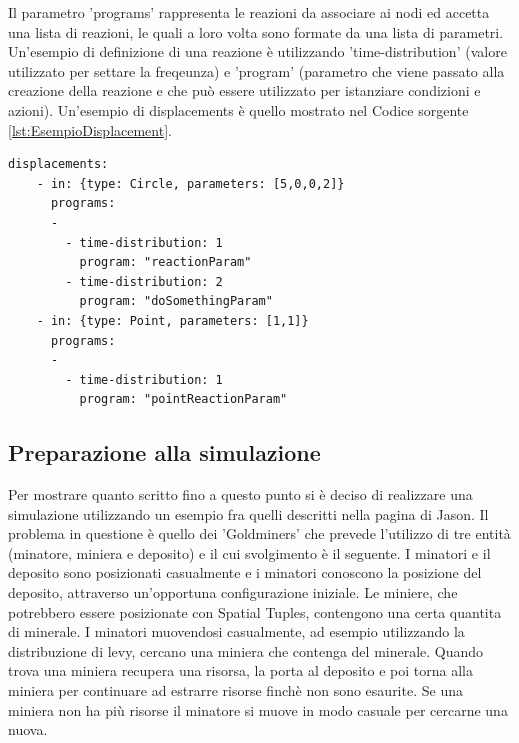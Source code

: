 \documentclass[12pt,a4paper,openright,twoside]{report}
\begin{document}
Il parametro 'programs' rappresenta le reazioni da associare ai nodi ed accetta una lista di reazioni, le quali a loro volta sono formate da una lista di parametri. Un'esempio di definizione di una reazione \`e utilizzando 'time-distribution' (valore utilizzato per settare la freqeunza) e 'program' (parametro che viene passato alla creazione della reazione e che pu\`o essere utilizzato per istanziare condizioni e azioni).
Un'esempio di displacements \`e quello mostrato nel Codice sorgente \ref{lst:EsempioDisplacement}.
\medskip
\begin{lstlisting}[firstnumber=last,label={lst:EsempioDisplacement},caption={Disposizione nodi e reazioni associate}]
  displacements:
    - in: {type: Circle, parameters: [5,0,0,2]}
      programs:
      -
        - time-distribution: 1
          program: "reactionParam"
        - time-distribution: 2
          program: "doSomethingParam"
    - in: {type: Point, parameters: [1,1]}
      programs:
      -
        - time-distribution: 1
          program: "pointReactionParam"
\end{lstlisting}

\subsection{Preparazione alla simulazione}
Per mostrare quanto scritto fino a questo punto si \`e deciso di realizzare una simulazione utilizzando un esempio fra quelli descritti nella pagina di Jason. Il problema in questione \`e quello dei 'Goldminers' che prevede l'utilizzo di tre entit\`a (minatore, miniera e deposito) e il cui svolgimento \`e il seguente. I minatori  e il deposito sono posizionati casualmente e i minatori conoscono la posizione del deposito, attraverso un'opportuna configurazione iniziale. Le miniere, che potrebbero essere posizionate con Spatial Tuples, contengono una certa quantita di minerale. I minatori muovendosi casualmente, ad esempio utilizzando la distribuzione di levy, cercano una miniera che contenga del minerale. Quando trova una miniera recupera una risorsa, la porta al deposito e poi torna alla miniera per continuare ad estrarre risorse finch\`e non sono esaurite. Se una miniera non ha pi\`u risorse il minatore si muove in modo casuale per cercarne una nuova.
\end{document}
